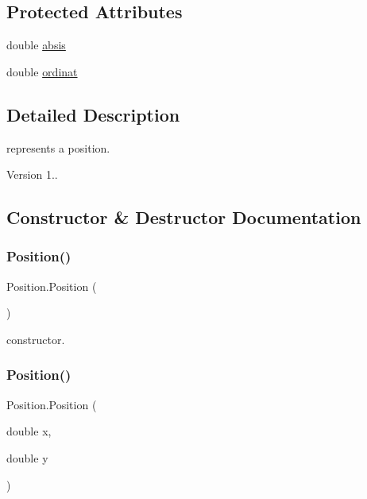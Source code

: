 \subsection*{Protected Attributes}
\begin{DoxyCompactItemize}
\item 
double \mbox{\hyperlink{class_position_a27a946f30bd667f0eebe00d192936af3}{absis}}
\item 
double \mbox{\hyperlink{class_position_a86ad71df5effd806afc43cce08f235d1}{ordinat}}
\end{DoxyCompactItemize}


\subsection{Detailed Description}
represents a position. \begin{DoxyVersion}{Version}
1.. 
\end{DoxyVersion}


\subsection{Constructor \& Destructor Documentation}
\mbox{\label{class_position_aa3cc120f6a85735ff705672c1b99330d}} 
\subsubsection{\texorpdfstring{Position()}{Position()}\hspace{0.1cm}{\footnotesize\ttfamily [1/2]}}
{\footnotesize\ttfamily Position.\+Position (\begin{DoxyParamCaption}{ }\end{DoxyParamCaption})\hspace{0.3cm}{\ttfamily [inline]}}

constructor. \mbox{\label{class_position_a40b0c2c90ebd4a00d7310b013e48b691}} 
\subsubsection{\texorpdfstring{Position()}{Position()}\hspace{0.1cm}{\footnotesize\ttfamily [2/2]}}
{\footnotesize\ttfamily Position.\+Position (\begin{DoxyParamCaption}\item[{double}]{x,  }\item[{double}]{y }\end{DoxyParamCaption})\hspace{0.3cm}{\ttfamily [inline]}}

